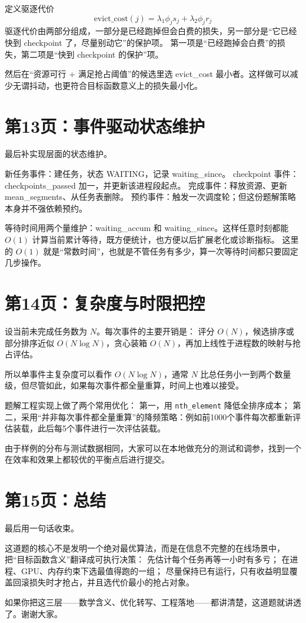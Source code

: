 \documentclass[12pt]{article}
\begin{document}
定义驱逐代价
\[
\text{evict\_cost}(j)=\lambda_1\phi_js_j+\lambda_2\phi_jr_j
\]
驱逐代价由两部分组成，一部分是已经跑掉但会白费的损失，另一部分是“它已经快到 checkpoint 了，尽量别动它”的保护项。
第一项是“已经跑掉会白费”的损失，第二项是“快到 checkpoint 的保护”项。

然后在“资源可行 + 满足抢占阈值”的候选里选 evict\_cost 最小者。这样做可以减少无谓抖动，也更符合目标函数意义上的损失最小化。

\section*{第13页：事件驱动状态维护}
最后补实现层面的状态维护。

新任务事件：建任务，状态 WAITING，记录 waiting\_since。
checkpoint 事件：checkpoints\_passed 加一，并更新该进程段起点。
完成事件：释放资源、更新 mean\_segments、从任务表删除。
预约事件：触发一次调度轮；但这份题解策略本身并不强依赖预约。

等待时间用两个量维护：waiting\_accum 和 waiting\_since。这样任意时刻都能 $O(1)$ 计算当前累计等待，既方便统计，也方便以后扩展老化或诊断指标。
这里的 $O(1)$ 就是“常数时间”，也就是不管任务有多少，算一次等待时间都只要固定几步操作。

\section*{第14页：复杂度与时限把控}
设当前未完成任务数为 $N$。每次事件的主要开销是：
评分 $O(N)$，候选排序或部分排序近似 $O(N\log N)$，贪心装箱 $O(N)$，再加上线性于进程数的映射与抢占评估。

所以单事件主复杂度可以看作 $O(N\log N)$，通常 $N$ 比总任务小一到两个数量级，但尽管如此，如果每次事件都全量重算，时间上也难以接受。

题解工程实现上做了两个常用优化：
第一，用 \texttt{nth\_element} 降低全排序成本；
第二，采用“并非每次事件都全量重算”的降频策略：例如前1000个事件每次都重新评估装载，此后每5个事件进行一次评估装载。

由于样例的分布与测试数据相同，大家可以在本地做充分的测试和调参，找到一个在效率和效果上都较优的平衡点后进行提交。


\section*{第15页：总结}
最后用一句话收束。

这道题的核心不是发明一个绝对最优算法，而是在信息不完整的在线场景中，把“目标函数含义”翻译成可执行决策：
先估计每个任务再等一小时有多亏；
在进程、GPU、内存约束下选最值得跑的一组；
尽量保持已有运行，只有收益明显覆盖回滚损失时才抢占，并且选代价最小的抢占对象。

如果你把这三层——数学含义、优化转写、工程落地——都讲清楚，这道题就讲透了。谢谢大家。
\end{document}
